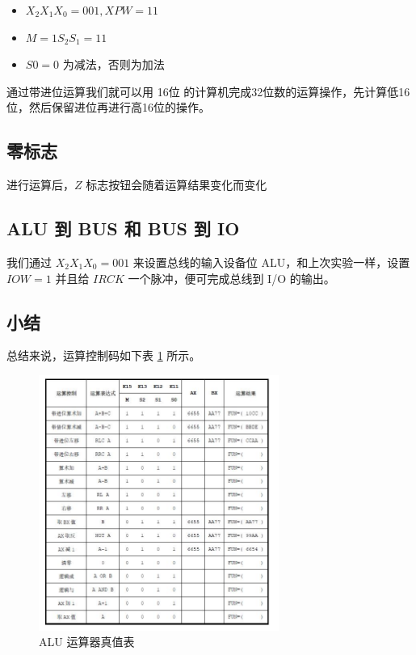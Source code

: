 \documentclass[a4paper,10pt,UTF8]{paper}
\numberwithin{equation}{section}
\numberwithin{figure}{section}
\begin{document}
\begin{itemize}
  \item $X_2X_1X_0=001,XPW=11$
  \item $M=1 S_2S_1=11$
  \item $S0=0$ 为减法，否则为加法
\end{itemize}

通过带进位运算我们就可以用 16位 的计算机完成32位数的运算操作，先计算低16位，然后保留进位再进行高16位的操作。


\subsection{零标志}

进行运算后，$Z$ 标志按钮会随着运算结果变化而变化

\subsection{ ALU 到 BUS 和 BUS 到 IO}


我们通过 $X_2X_1X_0 = 001$ 来设置总线的输入设备位 ALU，和上次实验一样，设置 $IOW = 1$ 并且给 $IRCK$ 一个脉冲，便可完成总线到 I/O 的输出。

\subsection{小结}

总结来说，运算控制码如下表 \ref{fig:calc} 所示。


\begin{figure}[h]
  \centering
  \includegraphics[width=0.7\textwidth]{calc.jpg}
  \caption{ALU 运算器真值表}
  \label{fig:calc}
\end{figure}
\end{document}
